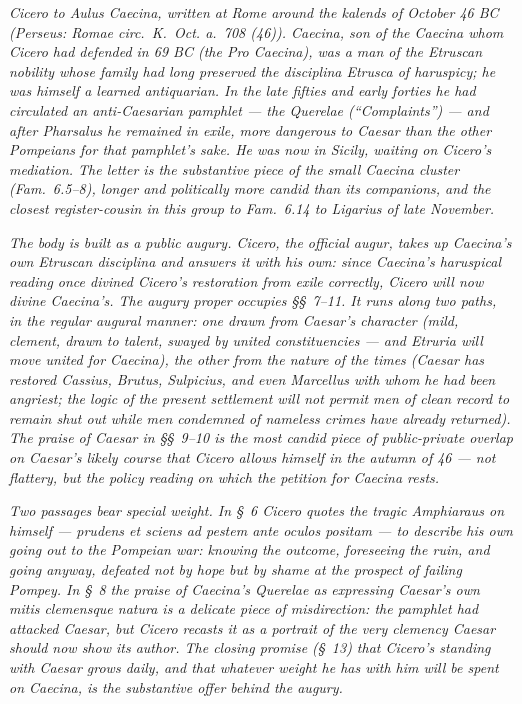 
\textit{Cicero to Aulus Caecina, written at Rome around the
kalends of October 46 BC (Perseus: \textit{Romae circ.~K.~Oct.
a.~708 (46)}). Caecina, son of the Caecina whom Cicero had
defended in 69 BC (the \textit{Pro Caecina}), was a man of the
Etruscan nobility whose family had long preserved the
\textit{disciplina Etrusca} of haruspicy; he was himself a
learned antiquarian. In the late fifties and early forties he
had circulated an anti-Caesarian pamphlet --- the
\textit{Querelae} (``Complaints'') --- and after Pharsalus he
remained in exile, more dangerous to Caesar than the other
Pompeians for that pamphlet's sake. He was now in Sicily,
waiting on Cicero's mediation. The letter is the substantive
piece of the small Caecina cluster (\textit{Fam.}~6.5--8), longer
and politically more candid than its companions, and the closest
register-cousin in this group to \textit{Fam.}~6.14 to Ligarius
of late November.}

\textit{The body is built as a public augury. Cicero, the
official augur, takes up Caecina's own Etruscan \textit{disciplina}
and answers it with his own: since Caecina's haruspical reading
once divined Cicero's restoration from exile correctly, Cicero
will now divine Caecina's. The augury proper occupies \S\S~7--11.
It runs along two paths, in the regular augural manner: one drawn
from Caesar's character (mild, clement, drawn to talent, swayed
by united constituencies --- and Etruria will move united for
Caecina), the other from the nature of the times (Caesar has
restored Cassius, Brutus, Sulpicius, and even Marcellus with whom
he had been angriest; the logic of the present settlement will
not permit men of clean record to remain shut out while men
condemned of nameless crimes have already returned). The praise
of Caesar in \S\S~9--10 is the most candid piece of public-private
overlap on Caesar's likely course that Cicero allows himself in
the autumn of 46 --- not flattery, but the policy reading on
which the petition for Caecina rests.}

\textit{Two passages bear special weight. In \S~6 Cicero
quotes the tragic Amphiaraus on himself --- \textit{prudens et
sciens ad pestem ante oculos positam} --- to describe his own
going out to the Pompeian war: knowing the outcome, foreseeing
the ruin, and going anyway, defeated not by hope but by shame at
the prospect of failing Pompey. In \S~8 the praise of Caecina's
\textit{Querelae} as expressing Caesar's own \textit{mitis
clemensque natura} is a delicate piece of misdirection: the
pamphlet had attacked Caesar, but Cicero recasts it as a portrait
of the very clemency Caesar should now show its author. The
closing promise (\S~13) that Cicero's standing with Caesar grows
daily, and that whatever weight he has with him will be spent on
Caecina, is the substantive offer behind the augury.}
